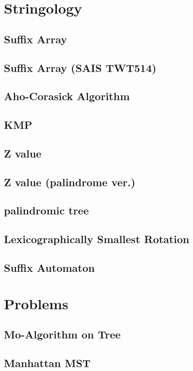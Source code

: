 \documentclass[a4paper,10pt,twocolumn,oneside]{article}
\begin{document}
\section{Stringology}
\subsection{Suffix Array}

\subsection{Suffix Array (SAIS TWT514)}

\subsection{Aho-Corasick Algorithm}

\subsection{KMP}

\subsection{Z value}

\subsection{Z value (palindrome ver.)}

\subsection{palindromic tree}

\subsection{Lexicographically Smallest Rotation}

\subsection{Suffix Automaton}


\section{Problems}
\subsection{Mo-Algorithm on Tree}

\subsection{Manhattan MST}

\end{document}
